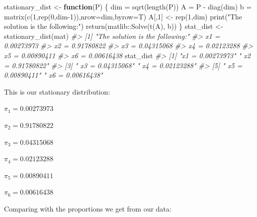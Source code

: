 \documentclass[
]{article}
\newenvironment{Shaded}{\begin{snugshade}}{\end{snugshade}}
\newcommand{\AttributeTok}[1]{\textcolor[rgb]{0.77,0.63,0.00}{#1}}
\newcommand{\CommentTok}[1]{\textcolor[rgb]{0.56,0.35,0.01}{\textit{#1}}}
\newcommand{\ControlFlowTok}[1]{\textcolor[rgb]{0.13,0.29,0.53}{\textbf{#1}}}
\newcommand{\DecValTok}[1]{\textcolor[rgb]{0.00,0.00,0.81}{#1}}
\newcommand{\FunctionTok}[1]{\textcolor[rgb]{0.00,0.00,0.00}{#1}}
\newcommand{\NormalTok}[1]{#1}
\newcommand{\OtherTok}[1]{\textcolor[rgb]{0.56,0.35,0.01}{#1}}
\newcommand{\SpecialCharTok}[1]{\textcolor[rgb]{0.00,0.00,0.00}{#1}}
\newcommand{\StringTok}[1]{\textcolor[rgb]{0.31,0.60,0.02}{#1}}
\begin{document}
\begin{Shaded}
\begin{Highlighting}[]
\NormalTok{stationary\_dist }\OtherTok{\textless{}{-}} \ControlFlowTok{function}\NormalTok{(P) \{}
\NormalTok{    dim }\OtherTok{=} \FunctionTok{sqrt}\NormalTok{(}\FunctionTok{length}\NormalTok{(P))}
\NormalTok{    A }\OtherTok{=}\NormalTok{ P }\SpecialCharTok{{-}} \FunctionTok{diag}\NormalTok{(dim)}
\NormalTok{    b }\OtherTok{=} \FunctionTok{matrix}\NormalTok{(}\FunctionTok{c}\NormalTok{(}\DecValTok{1}\NormalTok{,}\FunctionTok{rep}\NormalTok{(}\DecValTok{0}\NormalTok{,dim}\DecValTok{{-}1}\NormalTok{)),}\AttributeTok{nrow=}\NormalTok{dim,}\AttributeTok{byrow=}\NormalTok{T)}
\NormalTok{    A[,}\DecValTok{1}\NormalTok{] }\OtherTok{\textless{}{-}} \FunctionTok{rep}\NormalTok{(}\DecValTok{1}\NormalTok{,dim)}
    \FunctionTok{print}\NormalTok{(}\StringTok{"The solution is the following:"}\NormalTok{)}
    \FunctionTok{return}\NormalTok{(matlib}\SpecialCharTok{::}\FunctionTok{Solve}\NormalTok{(}\FunctionTok{t}\NormalTok{(A), b))}
\NormalTok{\}}
\NormalTok{stat\_dist }\OtherTok{\textless{}{-}} \FunctionTok{stationary\_dist}\NormalTok{(mat)}
\CommentTok{\#\textgreater{} [1] "The solution is the following:"}
\CommentTok{\#\textgreater{} x1            =  0.00273973 }
\CommentTok{\#\textgreater{}   x2          =  0.91780822 }
\CommentTok{\#\textgreater{}     x3        =  0.04315068 }
\CommentTok{\#\textgreater{}       x4      =  0.02123288 }
\CommentTok{\#\textgreater{}         x5    =  0.00890411 }
\CommentTok{\#\textgreater{}           x6  =  0.00616438}
\NormalTok{stat\_dist}
\CommentTok{\#\textgreater{} [1] "x1            =  0.00273973" "  x2          =  0.91780822"}
\CommentTok{\#\textgreater{} [3] "    x3        =  0.04315068" "      x4      =  0.02123288"}
\CommentTok{\#\textgreater{} [5] "        x5    =  0.00890411" "          x6  =  0.00616438"}
\end{Highlighting}
\end{Shaded}

This is our stationary distribution:

\(\pi_{1} = 0.00273973\)

\(\pi_{2} = 0.91780822\)

\(\pi_{3} = 0.04315068\)

\(\pi_{4} = 0.02123288\)

\(\pi_{5} = 0.00890411\)

\(\pi_{6} = 0.00616438\)

\newpage

Comparing with the proportions we get from our data:
\end{document}
